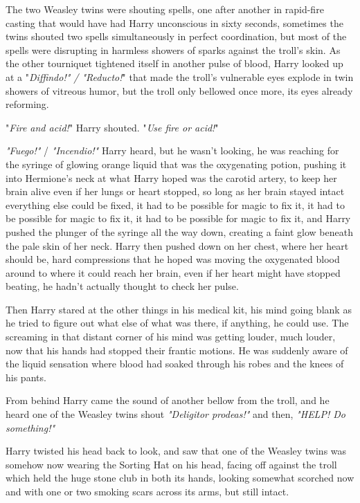 The two Weasley twins were shouting spells, one after another in rapid-fire 
casting that would have had Harry unconscious in sixty seconds, sometimes the 
twins shouted two spells simultaneously in perfect coordination, but most of 
the spells were disrupting in harmless showers of sparks against the troll's 
skin. As the other tourniquet tightened itself in another pulse of blood, Harry 
looked up at a "\emph{Diffindo!" / "Reducto!}" that made the troll's vulnerable 
eyes explode in twin showers of vitreous humor, but the troll only bellowed 
once more, its eyes already reforming.

"\emph{Fire and acid!}" Harry shouted. "\emph{Use fire or acid!}"

\emph{"Fuego!"} / \emph{"Incendio!"} Harry heard, but he wasn't looking, he was 
reaching for the syringe of glowing orange liquid that was the oxygenating 
potion, pushing it into Hermione's neck at what Harry hoped was the carotid 
artery, to keep her brain alive even if her lungs or heart stopped, so long as 
her brain stayed intact everything else could be fixed, it had to be possible 
for magic to fix it, it had to be possible for magic to fix it, it had to be 
possible for magic to fix it, and Harry pushed the plunger of the syringe all 
the way down, creating a faint glow beneath the pale skin of her neck. Harry 
then pushed down on her chest, where her heart should be, hard compressions 
that he hoped was moving the oxygenated blood around to where it could reach 
her brain, even if her heart might have stopped beating, he hadn't actually 
thought to check her pulse.

Then Harry stared at the other things in his medical kit, his mind going blank 
as he tried to figure out what else of what was there, if anything, he could 
use. The screaming in that distant corner of his mind was getting louder, much 
louder, now that his hands had stopped their frantic motions. He was suddenly 
aware of the liquid sensation where blood had soaked through his robes and the 
knees of his pants.

From behind Harry came the sound of another bellow from the troll, and he heard 
one of the Weasley twins shout \emph{"Deligitor prodeas!"} and then, 
\emph{"HELP! Do something!"}

Harry twisted his head back to look, and saw that one of the Weasley twins was 
somehow now wearing the Sorting Hat on his head, facing off against the troll 
which held the huge stone club in both its hands, looking somewhat scorched now 
and with one or two smoking scars across its arms, but still intact.

